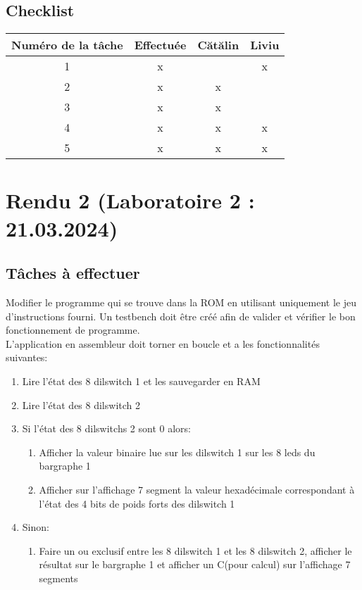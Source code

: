 \documentclass{article}
\begin{document}
    \subsection{Checklist}
    \begin{center}
        \begin{tabular}{|c|c|c|c|}
            \hline
            Numéro de la tâche & Effectuée & Cătălin & Liviu \\
            \hline
            \hline 1 & x &   & x \\ 
            \hline 2 & x & x &   \\
            \hline 3 & x & x &   \\
            \hline 4 & x & x & x \\
            \hline 5 & x & x & x \\
            \hline
        \end{tabular}
    \end{center}
    \newpage

    \section{Rendu 2 (Laboratoire 2 : 21.03.2024) }
    \subsection{Tâches à effectuer}
    Modifier le programme qui se trouve dans la ROM en utilisant uniquement le jeu d'instructions fourni. Un testbench doit être créé afin de valider et vérifier le bon fonctionnement de programme. \\
    L'application en assembleur doit torner en boucle et a les fonctionnalités suivantes:
    \begin{enumerate}
        \item Lire l'état des 8 dilswitch 1 et les sauvegarder en RAM
        \item Lire l'état des 8 dilswitch 2
        \item Si l'état des 8 dilswitchs 2 sont 0 alors:
        \begin{enumerate}
            \item Afficher la valeur binaire lue sur les dilswitch 1 sur les 8 leds du bargraphe 1
            \item Afficher sur l'affichage 7 segment la valeur hexadécimale correspondant à l'état des 4 bits de poids forts des dilswitch 1 
        \end{enumerate}
        \item Sinon:
        \begin{enumerate}
            \item Faire un ou exclusif entre les 8 dilswitch 1 et les 8 dilswitch 2, afficher le résultat sur le bargraphe 1 et afficher un C(pour calcul) sur l'affichage 7 segments
        \end{enumerate}
    \end{enumerate}
\end{document}
